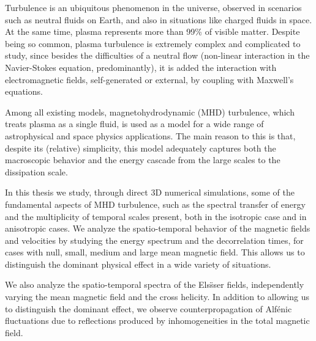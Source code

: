 Turbulence is an ubiquitous phenomenon in the universe, observed in
scenarios such as neutral fluids on Earth, and also in situations like
charged fluids in space. At the same time, plasma represents more than
99\% of visible matter. Despite being so common, plasma turbulence is
extremely complex and complicated to study, since besides the
difficulties of a neutral flow (non-linear interaction in the
Navier-Stokes equation, predominantly), it is added the interaction
with electromagnetic fields, self-generated or external, by coupling
with Maxwell's equations.

Among all existing models, magnetohydrodynamic (MHD) turbulence, which
treats plasma as a single fluid, is used as a model for a wide range
of astrophysical and space physics applications. The main reason to
this is that, despite its (relative) simplicity, this model adequately
captures both the macroscopic behavior and the energy cascade from the
large scales to the dissipation scale.

In this thesis we study, through direct 3D numerical simulations, some
of the fundamental aspects of MHD turbulence, such as the spectral
transfer of energy and the multiplicity of temporal scales present,
both in the isotropic case and in anisotropic cases. We analyze the
spatio-temporal behavior of the magnetic fields and velocities by
studying the energy spectrum and the decorrelation times, for cases
with null, small, medium and large mean magnetic field. This allows us
to distinguish the dominant physical effect in a wide variety of
situations.

We also analyze the spatio-temporal spectra of the Els\"sser fields,
independently varying the mean magnetic field and the cross
helicity. In addition to allowing us to distinguish the dominant
effect, we observe counterpropagation of Alf\'enic fluctuations due to
reflections produced by inhomogeneities in the total magnetic field.















